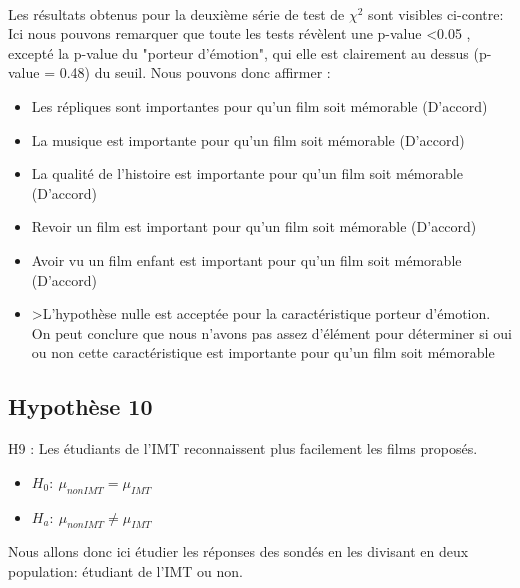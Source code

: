 \documentclass{article} %
\begin{document}
~\\
Les résultats obtenus pour la deuxième série de test de $\chi^2$ sont visibles ci-contre:\\
Ici nous pouvons remarquer que toute les tests révèlent une p-value <0.05 , excepté la p-value du "porteur d'émotion", qui elle est clairement au dessus (p-value = 0.48) du seuil. Nous pouvons donc affirmer :
\begin{itemize}
	\item Les répliques sont importantes pour qu'un film soit mémorable (D'accord)
	\item La musique est importante pour qu'un film soit mémorable (D'accord)
	\item La qualité de l'histoire est importante pour qu'un film soit mémorable (D'accord)
	\item Revoir un film est important pour qu'un film soit mémorable (D'accord)
	\item Avoir vu un film enfant est important pour qu'un film soit mémorable (D'accord)
	\item >L'hypothèse nulle est acceptée pour la caractéristique porteur d'émotion. On peut conclure que nous n'avons pas assez d'élément pour déterminer si oui ou non cette caractéristique est importante pour qu'un film soit mémorable
\end{itemize}
\subsection{Hypothèse 10}
H9 : Les étudiants de l’IMT reconnaissent plus facilement les films proposés.
\begin{itemize}
	\item $H_0 : \ \mu_{nonIMT} = \mu_{IMT}$
	\item $H_a : \ \mu_{nonIMT} \ne \mu_{IMT}$
\end{itemize}
Nous allons donc ici étudier les réponses des sondés en les divisant en deux population: étudiant de l’IMT ou non.
\end{document}
